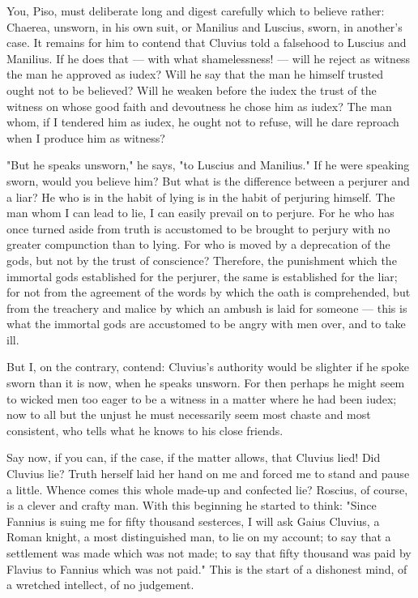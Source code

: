  You, Piso, must deliberate long and digest carefully which to believe rather: Chaerea, unsworn, in his own suit, or Manilius and Luscius, sworn, in another's case. It remains for him to contend that Cluvius told a falsehood to Luscius and Manilius. If he does that --- with what shamelessness! --- will he reject as witness the man he approved as iudex? Will he say that the man he himself trusted ought not to be believed? Will he weaken before the iudex the trust of the witness on whose good faith and devoutness he chose him as iudex? The man whom, if I tendered him as iudex, he ought not to refuse, will he dare reproach when I produce him as witness?

 "But he speaks unsworn," he says, "to Luscius and Manilius." If he were speaking sworn, would you believe him? But what is the difference between a perjurer and a liar? He who is in the habit of lying is in the habit of perjuring himself. The man whom I can lead to lie, I can easily prevail on to perjure. For he who has once turned aside from truth is accustomed to be brought to perjury with no greater compunction than to lying. For who is moved by a deprecation of the gods, but not by the trust of conscience? Therefore, the punishment which the immortal gods established for the perjurer, the same is established for the liar; for not from the agreement of the words by which the oath is comprehended, but from the treachery and malice by which an ambush is laid for someone --- this is what the immortal gods are accustomed to be angry with men over, and to take ill.

 But I, on the contrary, contend: Cluvius's authority would be slighter if he spoke sworn than it is now, when he speaks unsworn. For then perhaps he might seem to wicked men too eager to be a witness in a matter where he had been iudex; now to all but the unjust he must necessarily seem most chaste and most consistent, who tells what he knows to his close friends.

 Say now, if you can, if the case, if the matter allows, that Cluvius lied! Did Cluvius lie? Truth herself laid her hand on me and forced me to stand and pause a little. Whence comes this whole made-up and confected lie? Roscius, of course, is a clever and crafty man. With this beginning he started to think: "Since Fannius is suing me for fifty thousand sesterces, I will ask Gaius Cluvius, a Roman knight, a most distinguished man, to lie on my account; to say that a settlement was made which was not made; to say that fifty thousand was paid by Flavius to Fannius which was not paid." This is the start of a dishonest mind, of a wretched intellect, of no judgement.

